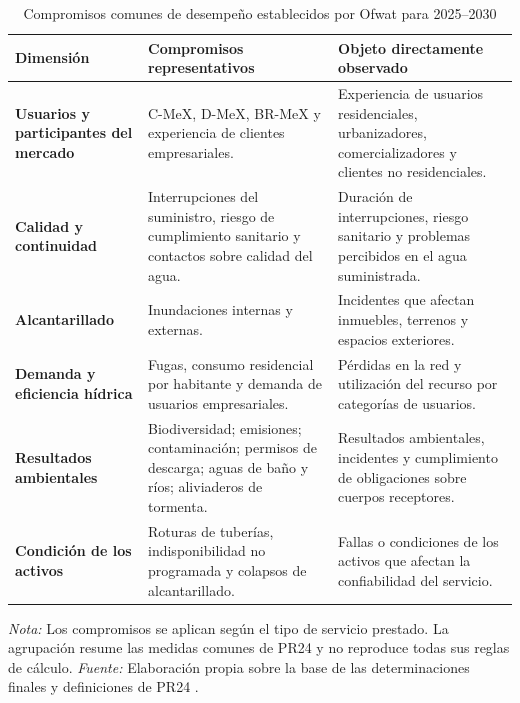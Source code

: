 \begin{table}[!t]
\centering
\caption{Compromisos comunes de desempeño establecidos por Ofwat para 2025--2030}
\label{tab:ofwat_compromisos_pr24}
\scriptsize
\renewcommand{\arraystretch}{1.18}
\setlength{\tabcolsep}{5pt}
\begin{tabularx}{\textwidth}{
>{\raggedright\arraybackslash}p{3.05cm}
>{\raggedright\arraybackslash}p{5.65cm}
>{\raggedright\arraybackslash}X}
\hline
\textbf{Dimensión} &
\textbf{Compromisos representativos} &
\textbf{Objeto directamente observado} \\
\hline

\textbf{Usuarios y participantes del mercado}
&
C-MeX, D-MeX, BR-MeX y experiencia de clientes empresariales.
&
Experiencia de usuarios residenciales, urbanizadores, comercializadores y clientes no residenciales.
\\

\textbf{Calidad y continuidad}
&
Interrupciones del suministro, riesgo de cumplimiento sanitario y contactos sobre calidad del agua.
&
Duración de interrupciones, riesgo sanitario y problemas percibidos en el agua suministrada.
\\

\textbf{Alcantarillado}
&
Inundaciones internas y externas.
&
Incidentes que afectan inmuebles, terrenos y espacios exteriores.
\\

\textbf{Demanda y eficiencia hídrica}
&
Fugas, consumo residencial por habitante y demanda de usuarios empresariales.
&
Pérdidas en la red y utilización del recurso por categorías de usuarios.
\\

\textbf{Resultados ambientales}
&
Biodiversidad; emisiones; contaminación; permisos de descarga; aguas de baño y ríos; aliviaderos de tormenta.
&
Resultados ambientales, incidentes y cumplimiento de obligaciones sobre cuerpos receptores.
\\

\textbf{Condición de los activos}
&
Roturas de tuberías, indisponibilidad no programada y colapsos de alcantarillado.
&
Fallas o condiciones de los activos que afectan la confiabilidad del servicio.
\\
\hline
\end{tabularx}

\begin{minipage}{\textwidth}
\footnotesize
\textit{Nota:} Los compromisos se aplican según el tipo de servicio prestado. La agrupación resume las medidas comunes de PR24 y no reproduce todas sus reglas de cálculo. \textit{Fuente:} Elaboración propia sobre la base de las determinaciones finales y definiciones de PR24 \citep{Ofwat2024Outcomes,Ofwat2025Definitions}.
\end{minipage}
\end{table}

